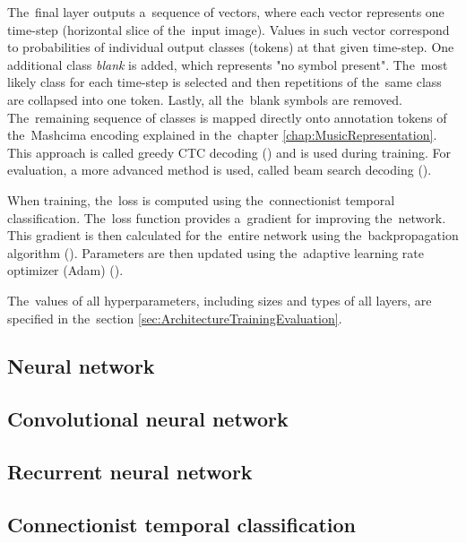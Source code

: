 The~final layer outputs a~sequence of vectors, where each vector represents one time-step (horizontal slice of the~input image). Values in such vector correspond to probabilities of individual output classes (tokens) at that given time-step. One additional class \emph{blank} is added, which represents "no symbol present". The~most likely class for each time-step is selected and then repetitions of the~same class are collapsed into one token. Lastly, all the~blank symbols are removed. The~remaining sequence of classes is mapped directly onto annotation tokens of the~Mashcima encoding explained in the~chapter \ref{chap:MusicRepresentation}. This approach is called greedy CTC decoding (\cite{CTC}) and is used during training. For evaluation, a more advanced method is used, called beam search decoding (\cite{CtcBeamSearch}).

When training, the~loss is computed using the~connectionist temporal classification. The~loss function provides a~gradient for improving the~network. This gradient is then calculated for the~entire network using the~backpropagation algorithm (\cite{Goodfellow-et-al-2016}). Parameters are then updated using the~adaptive learning rate optimizer (Adam) (\cite{AdamOptimizer}).

The~values of all hyperparameters, including sizes and types of all layers, are specified in the~section \ref{sec:ArchitectureTrainingEvaluation}.


\subsection{Neural network}


\subsection{Convolutional neural network}


\subsection{Recurrent neural network}


\subsection{Connectionist temporal classification}
